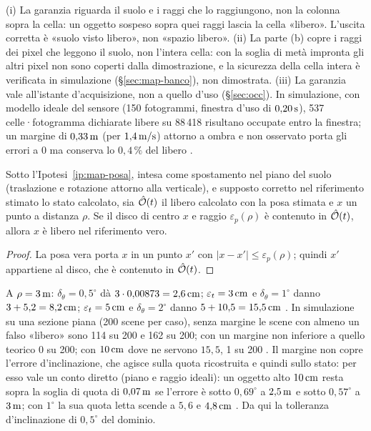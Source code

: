 \begin{osservazione}\label{oss:map-nondice}
(i) La garanzia riguarda il suolo e i raggi che lo raggiungono, non la colonna sopra la cella: un oggetto sospeso sopra quei raggi lascia la cella «libero». L'uscita corretta è «suolo visto libero», non «spazio libero». (ii) La parte (b) copre i raggi dei pixel che leggono il suolo, non l'intera cella: con la soglia di metà impronta gli altri pixel non sono coperti dalla dimostrazione, e la sicurezza della cella intera è verificata in simulazione (\S\ref{sec:map-banco}), non dimostrata. (iii) La garanzia vale all'istante d'acquisizione, non a quello d'uso (\S\ref{sec:occ}). In simulazione, con modello ideale del sensore (150 fotogrammi, finestra d'uso di $0{,}20\,\mathrm{s}$), 537 celle·fotogramma dichiarate libere su 88\,418 risultano occupate entro la finestra; un margine di $0{,}33\,\mathrm{m}$ (per $1{,}4\,\mathrm{m/s}$) attorno a ombra e non osservato porta gli errori a 0 ma conserva lo $0{,}4\,\%$ del libero .
\end{osservazione}

\begin{lemma}\label{lem:map-posa}
Sotto l'Ipotesi~\ref{ip:map-posa}, intesa come spostamento nel piano del suolo (traslazione e rotazione attorno alla verticale), e supposto corretto nel riferimento stimato lo stato calcolato, sia $\hat{\mathcal{O}}(t)$ il libero calcolato con la posa stimata e $x$ un punto a distanza $\rho$. Se il disco di centro $x$ e raggio $\varepsilon_p(\rho)$ è contenuto in $\hat{\mathcal{O}}(t)$, allora $x$ è libero nel riferimento vero.
\end{lemma}
\begin{proof} La posa vera porta $x$ in un punto $x'$ con $|x-x'|\le\varepsilon_p(\rho)$; quindi $x'$ appartiene al disco, che è contenuto in $\hat{\mathcal{O}}(t)$.\end{proof}
A $\rho=3\,\mathrm{m}$: $\delta_\theta=0{,}5^\circ$ dà $3\cdot0{,}00873=2{,}6\,\mathrm{cm}$; $\varepsilon_t=3\,\mathrm{cm}$ e $\delta_\theta=1^\circ$ danno $3+5{,}2=8{,}2\,\mathrm{cm}$; $\varepsilon_t=5\,\mathrm{cm}$ e $\delta_\theta=2^\circ$ danno $5+10{,}5=15{,}5\,\mathrm{cm}$ . In simulazione su una sezione piana (200 scene per caso), senza margine le scene con almeno un falso «libero» sono 114 su 200 e 162 su 200; con un margine non inferiore a quello teorico 0 su 200; con $10\,\mathrm{cm}$ dove ne servono $15{,}5$, 1 su 200 . Il margine non copre l'errore d'inclinazione, che agisce sulla quota ricostruita e quindi sullo stato: per esso vale un conto diretto (piano e raggio ideali): un oggetto alto $10\,\mathrm{cm}$ resta sopra la soglia di quota di $0{,}07\,\mathrm{m}$ se l'errore è sotto $0{,}69^\circ$ a $2{,}5\,\mathrm{m}$ e sotto $0{,}57^\circ$ a $3\,\mathrm{m}$; con $1^\circ$ la sua quota letta scende a $5{,}6$ e $4{,}8\,\mathrm{cm}$ . Da qui la tolleranza d'inclinazione di $0{,}5^\circ$ del dominio.


